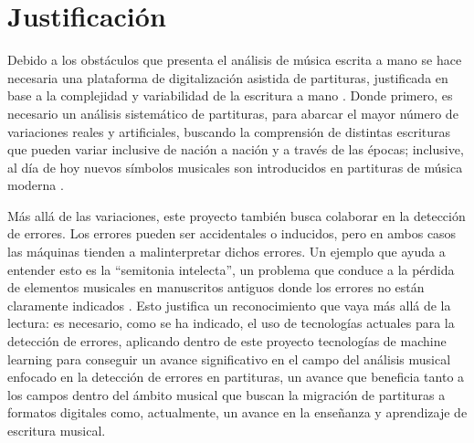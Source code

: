 \section{Justificaci\'on}

Debido a los obst\'aculos que presenta el an\'alisis de m\'usica escrita a mano se hace necesaria una plataforma de digitalizaci\'on asistida de partituras, justificada en base a la complejidad y variabilidad de la escritura a mano \cite{ricordi2024}. Donde primero, es necesario un an\'alisis sistem\'atico de partituras, para abarcar el mayor n\'umero de variaciones reales y artificiales, buscando la comprensi\'on de distintas escrituras que pueden variar inclusive de naci\'on a naci\'on y a trav\'es de las \'epocas; inclusive, al d\'ia de hoy nuevos s\'imbolos musicales son introducidos en partituras de m\'usica moderna \cite{rebelo2012}.

M\'as all\'a de las variaciones, este proyecto tambi\'en busca colaborar en la detecci\'on de errores. Los errores pueden ser accidentales o inducidos, pero en ambos casos las m\'aquinas tienden a malinterpretar dichos errores. Un ejemplo que ayuda a entender esto es la ``semitonia intelecta'', un problema que conduce a la p\'erdida de elementos musicales en manuscritos antiguos donde los errores no est\'an claramente indicados \cite{rizo2023}. Esto justifica un reconocimiento que vaya m\'as all\'a de la lectura: es necesario, como se ha indicado, el uso de tecnolog\'ias actuales para la detecci\'on de errores, aplicando dentro de este proyecto tecnolog\'ias de machine learning para conseguir un avance significativo en el campo del an\'alisis musical enfocado en la detecci\'on de errores en partituras, un avance que beneficia tanto a los campos dentro del \'ambito musical que buscan la migraci\'on de partituras a formatos digitales como, actualmente, un avance en la ense\~nanza y aprendizaje de escritura musical.
